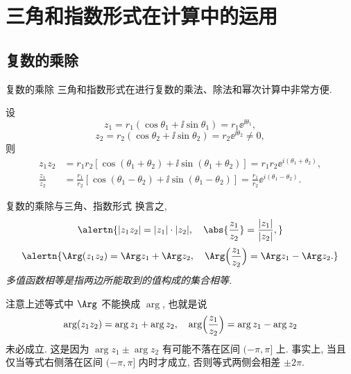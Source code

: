 \section{三角和指数形式在计算中的运用}

\subsection{复数的乘除}
\begin{frame}{复数的乘除}
	\onslide<+->
	三角和指数形式在进行复数的乘法、除法和幂次计算中非常方便.

	\onslide<+->
	\begin{theorem}
		设
	\[
		z_1=r_1(\cos\theta_1+\ii\sin\theta_1)=r_1\ee^{\ii\theta_1},
	\]
	\[
		z_2=r_2(\cos\theta_2+\ii\sin\theta_2)=r_2\ee^{\ii\theta_2}\neq 0,
	\]
		则
		\begin{align*}
			z_1z_2&=r_1r_2[\cos(\theta_1+\theta_2)+\ii\sin(\theta_1+\theta_2)]=r_1r_2\ee^{i(\theta_1+\theta_2)},\\
			\frac{z_1}{z_2}&=\frac{r_1}{r_2}[\cos(\theta_1-\theta_2)+\ii\sin(\theta_1-\theta_2)]=\frac{r_1}{r_2}\ee^{i(\theta_1-\theta_2)}.
		\end{align*}
	\end{theorem}
\end{frame}


\begin{frame}{复数的乘除与三角、指数形式}
	\onslide<+->
	换言之,
	\[\alertn{|z_1z_2|=|z_1|\cdot|z_2|,\quad\abs{\frac{z_1}{z_2}}=\frac{|z_1|}{|z_2|},}
	\]
	\onslide<+->
	\[\alertn{\Arg(z_1z_2)=\Arg z_1+\Arg z_2,\quad
	\Arg\Bigl(\frac{z_1}{z_2}\Bigr)=\Arg z_1-\Arg z_2.}
	\]
	\onslide<+->
	\emph{多值函数相等是指两边所能取到的值构成的集合相等.}

	\onslide<+->
	注意上述等式中 $\Arg$ 不能换成 $\arg$, 也就是说
	\[\arg(z_1z_2)=\arg z_1+\arg z_2,\quad
	\arg\Bigl(\frac{z_1}{z_2}\Bigr)=\arg z_1-\arg z_2
	\]
	\alert{未必成立}.
	\onslide<+->
	这是因为 $\arg z_1\pm\arg z_2$ 有可能不落在区间 $(-\pi,\pi]$ 上.
	\onslide<+->
	事实上, 当且仅当等式右侧落在区间 $(-\pi,\pi]$ 内时才成立, 否则等式两侧会相差 $\pm2\pi$.
\end{frame}


